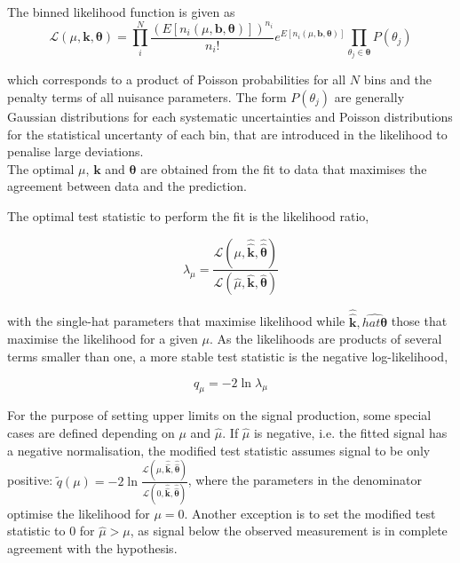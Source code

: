 The binned likelihood function is given as
\begin{equation}
    \mathscr{L}(\mu,\mathbf{k},\boldsymbol{\theta}) = \prod_i^N \frac{ (E[n_i(\mu,\mathbf{b},\boldsymbol{\theta})])^{n_i}}{n_i!}e^{E[n_i(\mu,\mathbf{b},\boldsymbol{\theta})]}\prod_{\theta_j\in\boldsymbol{\theta}}P(\theta_j)
\end{equation}

which corresponds to a product of Poisson probabilities for all $N$ bins and the penalty terms of all nuisance parameters. The form $P(\theta_j)$ are generally Gaussian distributions for each systematic uncertainties and Poisson distributions for the statistical uncertanty of each bin, that are introduced in the likelihood to penalise large deviations.\\


The optimal $\mu$, $\mathbf{k}$ and $\boldsymbol{\theta}$ are obtained from the fit to data that maximises the agreement between data and the prediction.

The optimal test statistic to perform the fit is the likelihood ratio, %

\begin{equation}
    \lambda_\mu = \frac{\mathscr{L}(\mu, \hat{\hat{\mathbf{k}}},\hat{\hat{\boldsymbol{\theta}}})}{\mathscr{L}(\hat{\mu}, \hat{\mathbf{k}},\hat{\boldsymbol{\theta}})}
\end{equation}

with the single-hat parameters that maximise likelihood while $\hat{\hat{\mathbf{k}}},\hat{hat{\boldsymbol{\theta}}}$ those that maximise the likelihood for a given $\mu$. As the likelihoods are products of several terms smaller than one, a more stable test statistic is the negative log-likelihood,

\begin{equation}
    q_\mu = -2\ln\lambda_\mu
\end{equation}

For the purpose of setting upper limits on the signal production, some special cases are defined depending on $\mu$ and $\hat{\mu}$. If $\hat{\mu}$ is negative, i.e. the fitted signal has a negative normalisation, the modified test statistic assumes signal to be only positive: $\tilde{q}(\mu)=-2\ln\frac{\mathscr{L}(\mu, \hat{\hat{\mathbf{k}}},\hat{\hat{\boldsymbol{\theta}}})}{\mathscr{L}(0, \hat{\hat{\mathbf{k}}},\hat{\hat{\boldsymbol{\theta}}})}$, where the parameters in the denominator optimise the likelihood for $\mu=0$. Another exception is to set the modified test statistic to 0 for $\hat{\mu}>\mu$, as signal below the observed measurement is in complete agreement with the hypothesis.\\


